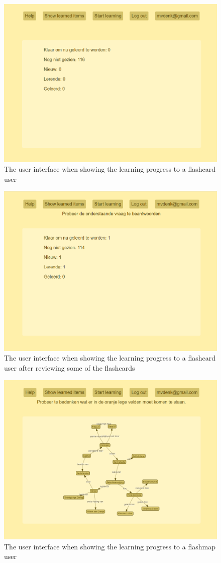 \begin{figure}
    \centering
    \includegraphics[width=.8\textwidth]{img/ui_fc_learnprogress_1.png}
    \caption{The user interface when showing the learning progress to a flashcard user}
    \label{fig:ui_fc_learnprogress_1}
\end{figure}

\begin{figure}
    \centering
    \includegraphics[width=.8\textwidth]{img/ui_fc_learnprogress_2.png}
    \caption{The user interface when showing the learning progress to a flashcard user after reviewing some of the flashcards}
    \label{fig:ui_fc_learnprogress_2}
\end{figure}

\begin{figure}
    \centering
    \includegraphics[width=.8\textwidth]{img/ui_fm_learnprogress.png}
    \caption{The user interface when showing the learning progress to a flashmap user}
    \label{fig:ui_fm_learnprogress}
\end{figure}

